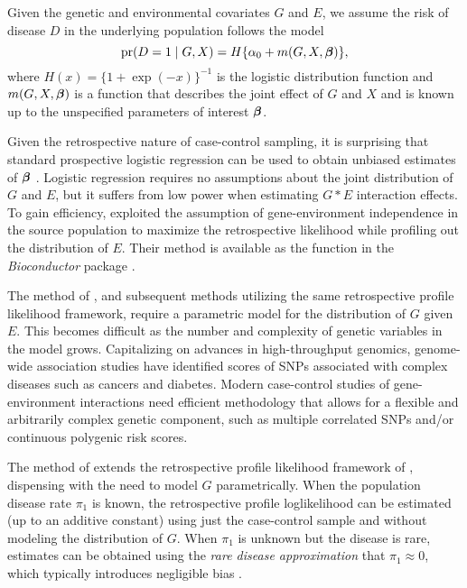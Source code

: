 \documentclass[nojss]{jss}
\begin{document}
Given the genetic and environmental covariates \(G\) and \(E\), we
assume the risk of disease \(D\) in the underlying population follows
the model \[ \hbox{pr}(D=1 \mid G,X) = H\{\alpha_0 + m(G,X,\mbox{\boldmath $\beta$})\}, \] where
\(H(x)=\{ 1 + \exp(-x)\}^{-1}\) is the logistic distribution function
and \(m(G,X,\mbox{\boldmath $\beta$})\) is a function that describes the joint effect of
\(G\) and \(X\) and is known up to the unspecified parameters of
interest \(\mbox{\boldmath $\beta$}\).

Given the retrospective nature of case-control sampling, it is
surprising that standard prospective logistic regression can be used to
obtain unbiased estimates of \(\mbox{\boldmath $\beta$}\) \citep{PrenticePyke1979}.
Logistic regression requires no assumptions about the joint distribution
of \(G\) and \(E\), but it suffers from low power when estimating
\(G * E\) interaction effects. To gain efficiency,
\citet{ChatterjeeCarroll2005} exploited the assumption of
gene-environment independence in the source population to maximize the
retrospective likelihood while profiling out the distribution of \(E\).
Their method is available as the function  in the
\emph{Bioconductor} package  \citep{CGEN2012}.

The method of \citeauthor{ChatterjeeCarroll2005}, and subsequent methods
utilizing the same retrospective profile likelihood framework, require a
parametric model for the distribution of \(G\) given \(E\). This becomes
difficult as the number and complexity of genetic variables in the model
grows. Capitalizing on advances in high-throughput genomics, genome-wide
association studies have identified scores of SNPs associated with
complex diseases such as cancers and diabetes. Modern case-control
studies of gene-environment interactions need efficient methodology that
allows for a flexible and arbitrarily complex genetic component, such as
multiple correlated SNPs and/or continuous polygenic risk scores.

The method of \citet{Stalder2017} extends the retrospective profile
likelihood framework of \citeauthor{ChatterjeeCarroll2005}, dispensing
with the need to model \(G\) parametrically. When the population disease
rate \(\pi_1\) is known, the retrospective profile loglikelihood can be
estimated (up to an additive constant) using just the case-control
sample and without modeling the distribution of \(G\). When \(\pi_1\) is
unknown but the disease is rare, estimates can be obtained using the
\emph{rare disease approximation} that \(\pi_1 \approx 0\), which
typically introduces negligible bias \citep{Stalder2017}.
\end{document}

